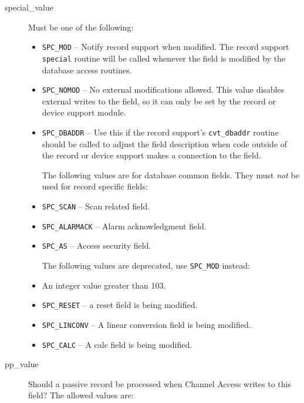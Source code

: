 \begin{description}
\begin{itemize}
\end{itemize}

\item [special\_value] Must be one of the following:

\begin{itemize}
\item \verb|SPC_MOD| -- Notify record support when modified.
The record support \verb|special| routine will be called whenever the field is modified by the database access routines.

\item \verb|SPC_NOMOD| -- No external modifications allowed.
This value disables external writes to the field, so it can only be set by the record or device support module.

\item \verb|SPC_DBADDR| -- Use this if the record support's \verb|cvt_dbaddr| routine should be called to adjust the field description when code outside of the record or device support makes a connection to the field.

The following values are for database common fields.
They must \emph{not} be used for record specific fields:

\item \verb|SPC_SCAN| -- Scan related field.

\item \verb|SPC_ALARMACK| -- Alarm acknowledgment field.

\item \verb|SPC_AS| -- Access security field.

The following values are deprecated, use \verb|SPC_MOD| instead:

\item An integer value greater than 103.

\item \verb|SPC_RESET| -- a reset field is being modified.

\item \verb|SPC_LINCONV| -- A linear conversion field is being modified.

\item \verb|SPC_CALC| -- A calc field is being modified.
\end{itemize}

\item [pp\_value] Should a passive record be processed when Channel Access writes to this field?
The allowed values are:


\end{description}
